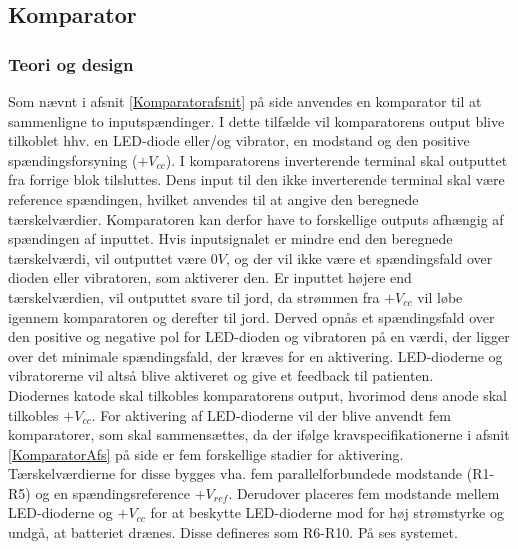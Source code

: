 \subsection{Komparator}
\subsubsection{Teori og design}
Som nævnt i afsnit \ref{Komparatorafsnit} på side \pageref{Komparatorafsnit} anvendes en komparator til at sammenligne to inputspændinger. I dette tilfælde vil komparatorens output blive tilkoblet hhv. en LED-diode eller/og vibrator, en modstand og den positive spændingsforsyning ($+V_{cc}$). I komparatorens inverterende terminal skal outputtet fra forrige blok tilsluttes. Dens input til den ikke inverterende terminal skal være reference spændingen, hvilket anvendes til at angive den beregnede tærskelværdier. Komparatoren kan derfor have to forskellige outputs afhængig af spændingen af inputtet. Hvis inputsignalet er mindre end den beregnede tærskelværdi, vil outputtet være $0V$, og der vil ikke være et spændingsfald over dioden eller vibratoren, som aktiverer den. Er inputtet højere end tærskelværdien, vil outputtet svare til jord, da strømmen fra $+V_{cc}$ vil løbe igennem komparatoren og derefter til jord. Derved opnås et spændingsfald over den positive og negative pol for LED-dioden og vibratoren på en værdi, der ligger over det minimale spændingsfald, der kræves for en aktivering. LED-dioderne og vibratorerne vil altså blive aktiveret og give et feedback til patienten. \\
Diodernes katode skal tilkobles komparatorens output, hvorimod dens anode skal tilkobles $+V_{cc}$. For aktivering af LED-dioderne vil der blive anvendt fem komparatorer, som skal sammensættes, da der ifølge kravspecifikationerne i afsnit \ref{KomparatorAfs} på side \pageref{KomparatorAfs} er fem forskellige stadier for aktivering. Tærskelværdierne for disse bygges vha. fem parallelforbundede modstande (R1-R5) og en spændingsreference $+V_{ref}$. Derudover placeres fem modstande mellem LED-dioderne og $+V_{cc}$ for at beskytte LED-dioderne mod for høj strømstyrke og undgå, at batteriet drænes. Disse defineres som R6-R10. På  ses systemet.\\


